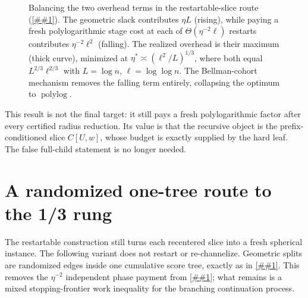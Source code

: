 \documentclass[10pt]{article}
\newcommand{\cref}[1]{\ref{##1}}
\theoremstyle{definition}
\newcommand{\polylog}{\operatorname{polylog}}
\begin{document}
\begin{figure}[t]\centering
{}
\caption{Balancing the two overhead terms in the restartable-slice route (\cref{prop:slice-two-thirds}). The geometric slack contributes $\eta L$ (rising), while paying a fresh polylogarithmic stage cost at each of $\Theta(\eta^{-2}\ell)$ restarts contributes $\eta^{-2}\ell^2$ (falling). The realized overhead is their maximum (thick curve), minimized at $\eta^*\asymp(\ell^2/L)^{1/3}$, where both equal $L^{2/3}\ell^{2/3}$ with $L=\log n$, $\ell=\log\log n$. The Bellman-cohort mechanism removes the falling term entirely, collapsing the optimum to $\polylog$.}
\label{fig:balance}
\end{figure}

This result is not the final target: it still pays a fresh polylogarithmic factor after every certified radius reduction. Its value is that the recursive object is the prefix-conditioned slice $C[U,w]$, whose budget is exactly supplied by the hard leaf. The false full-child statement is no longer needed.

\section{A randomized one-tree route to the 1/3 rung}

The restartable construction still turns each recentered slice into a fresh spherical instance. The following variant does not restart or re-channelize. Geometric splits are randomized edges inside one cumulative score tree, exactly as in \cref{lem:thin-cap-contraction}. This removes the $\eta^{-2}$ independent phase payment from \cref{prop:slice-two-thirds}; what remains is a mixed stopping-frontier work inequality for the branching continuation process.
\end{document}
